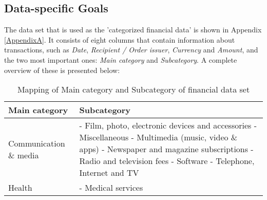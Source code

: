 
\subsection{Data-specific Goals}

The data set that is used as the 'categorized financial data' is shown in Appendix \ref{AppendixA}. It consists of eight columns that contain information about transactions, such as \textit{Date}, \textit{Recipient / Order issuer}, \textit{Currency} and \textit{Amount}, and the two most important ones: \textit{Main category} and \textit{Subcategory}. A complete overview of these is presented below:

\begin{table}[t]
	\begin{center}
		\begin{tabular}{ | p{6cm} | p{8cm} | } 
			\hline
			\textbf{Main category} & \textbf{Subcategory} \\
			\hline
			Communication \& media &
			- Film, photo, electronic devices and accessories \newline
			- Miscellaneous \newline
			- Multimedia (music, video \& apps) \newline
			- Newspaper and magazine subscriptions \newline
			- Radio and television fees \newline
			- Software \newline
			- Telephone,  Internet and TV \\
			\hline
			Health &
			- Medical services
			\hline
			\hline
			\hline
			\hline
			\hline
		\end{tabular}
		\caption{Mapping of Main category and Subcategory of financial data set}
		\label{tbl:financialcategories}
	\end{center}
\end{table}

